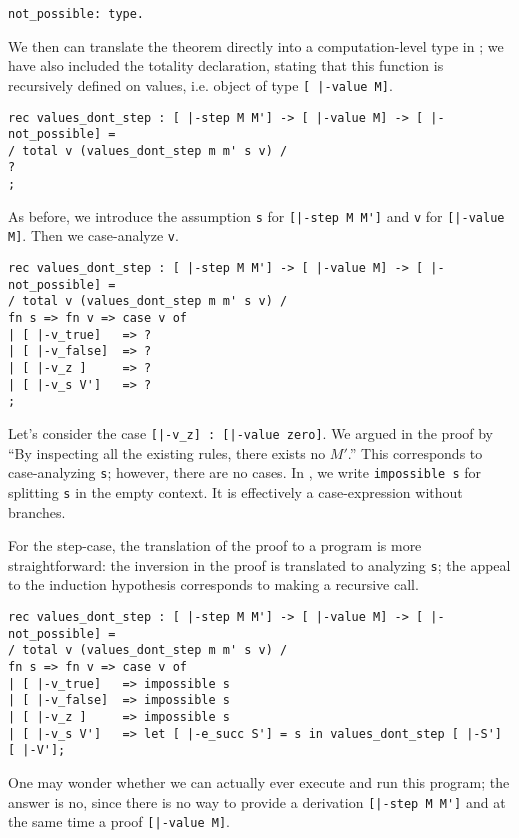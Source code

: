 \begin{lstlisting}
not_possible: type.
\end{lstlisting}

We then can translate the theorem directly into a computation-level type in
\beluga; we have also included the totality  declaration, stating that this
function is recursively defined on values, i.e. object of type \lstinline![ |-value M]!.

\begin{lstlisting}
rec values_dont_step : [ |-step M M'] -> [ |-value M] -> [ |-not_possible] =
/ total v (values_dont_step m m' s v) /
?
;
\end{lstlisting}

As before, we introduce the assumption \lstinline!s! for
\lstinline![|-step M M']! and \lstinline!v! for
\lstinline![|-value M]!. Then we case-analyze \lstinline!v!.

\begin{lstlisting}
rec values_dont_step : [ |-step M M'] -> [ |-value M] -> [ |-not_possible] =
/ total v (values_dont_step m m' s v) /
fn s => fn v => case v of
| [ |-v_true]   => ?
| [ |-v_false]  => ?
| [ |-v_z ]     => ?
| [ |-v_s V']   => ?
;
\end{lstlisting}

Let's consider the case \lstinline![|-v_z] : [|-value zero]!. We argued in the
proof by ``By inspecting all the existing rules, there exists no $M'$.'' This
corresponds to case-analyzing \lstinline!s!; however, there are no cases. In
\beluga, we write \lstinline!impossible s! for splitting \lstinline!s! in
the empty context. It is effectively a case-expression without branches.

For the step-case, the translation of the proof to a program is more
straightforward: the inversion in the proof is translated to analyzing
\lstinline!s!; the appeal to the induction hypothesis corresponds to making a
recursive call.

\begin{lstlisting}
rec values_dont_step : [ |-step M M'] -> [ |-value M] -> [ |-not_possible] =
/ total v (values_dont_step m m' s v) /
fn s => fn v => case v of
| [ |-v_true]   => impossible s
| [ |-v_false]  => impossible s
| [ |-v_z ]     => impossible s
| [ |-v_s V']   => let [ |-e_succ S'] = s in values_dont_step [ |-S'] [ |-V'];
\end{lstlisting}

One may wonder whether we can actually ever execute and run this program; the
answer is no, since there is no way to provide a derivation
\lstinline![|-step M M']! and at the same time a proof \lstinline![|-value M]!.


